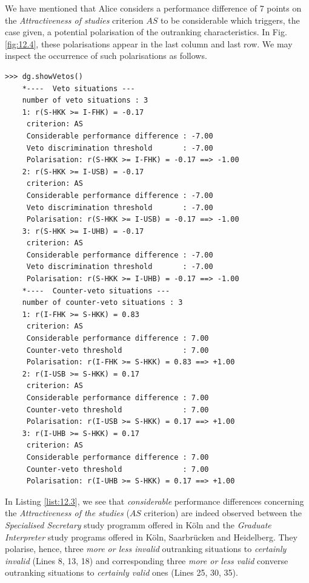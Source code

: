 We have mentioned that Alice considers a performance difference of 7 points on the \emph{Attractiveness of studies} criterion $AS$ to be considerable which triggers, the case given, a potential polarisation of the outranking characteristics. In Fig. \ref{fig:12.4}, these polarisations appear in the last column and last row. We may inspect the occurrence of such polarisations as follows.
\begin{lstlisting}[caption={Polarised outranking situations},label=list:12.3]
>>> dg.showVetos()
    *----  Veto situations ---
    number of veto situations : 3 
    1: r(S-HKK >= I-FHK) = -0.17
     criterion: AS
     Considerable performance difference : -7.00
     Veto discrimination threshold       : -7.00
     Polarisation: r(S-HKK >= I-FHK) = -0.17 ==> -1.00
    2: r(S-HKK >= I-USB) = -0.17
     criterion: AS
     Considerable performance difference : -7.00
     Veto discrimination threshold       : -7.00
     Polarisation: r(S-HKK >= I-USB) = -0.17 ==> -1.00
    3: r(S-HKK >= I-UHB) = -0.17
     criterion: AS
     Considerable performance difference : -7.00
     Veto discrimination threshold       : -7.00
     Polarisation: r(S-HKK >= I-UHB) = -0.17 ==> -1.00
    *----  Counter-veto situations ---
    number of counter-veto situations : 3 
    1: r(I-FHK >= S-HKK) = 0.83
     criterion: AS
     Considerable performance difference : 7.00
     Counter-veto threshold              : 7.00
     Polarisation: r(I-FHK >= S-HKK) = 0.83 ==> +1.00
    2: r(I-USB >= S-HKK) = 0.17
     criterion: AS
     Considerable performance difference : 7.00
     Counter-veto threshold              : 7.00
     Polarisation: r(I-USB >= S-HKK) = 0.17 ==> +1.00
    3: r(I-UHB >= S-HKK) = 0.17
     criterion: AS
     Considerable performance difference : 7.00
     Counter-veto threshold              : 7.00
     Polarisation: r(I-UHB >= S-HKK) = 0.17 ==> +1.00
\end{lstlisting}
In Listing \ref{list:12.3}, we see that \emph{considerable} performance differences concerning the \emph{Attractiveness of the studies} ($AS$ criterion) are indeed observed between the \emph{Specialised Secretary} study programm offered in Köln and the \emph{Graduate Interpreter} study programs offered in Köln, Saarbrücken and Heidelberg. They polarise, hence, three \emph{more or less invalid} outranking situations to \emph{certainly invalid} (Lines 8, 13, 18) and corresponding three \emph{more or less valid} converse outranking situations to \emph{certainly valid} ones (Lines 25, 30, 35). 


